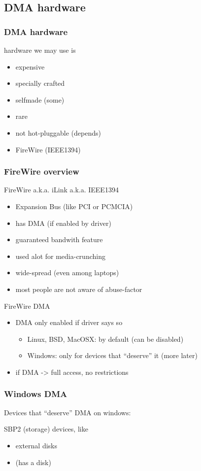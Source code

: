 \documentclass{beamer}
\newenvironment{itemizeframe}[1]
  {\begin{frame}{#1}\startitemizeframe}
  {\stopitemizeframe\end{frame}}
\newcommand\startitemizeframe{\begin{itemize}}
\newcommand\stopitemizeframe{\end{itemize}}
\begin{document}
	\subsection{DMA hardware}

		\begin{frame} \frametitle{DMA hardware}
			hardware we may use is
			\begin{itemize}
				\item expensive
				\item specially crafted
				\item selfmade (some)
				\item rare
				\item not hot-pluggable (depends)
				\item {} FireWire (IEEE1394)
			\end{itemize}
		\end{frame}

		\begin{frame} \frametitle{FireWire overview}
			 FireWire a.k.a. iLink a.k.a. IEEE1394
			\begin{itemize}
				\item Expansion Bus (like PCI or PCMCIA)
				\item has DMA (if enabled by driver)
				\item guaranteed bandwith feature
				\item used alot for media-crunching
				\item wide-spread (even among laptops)
				\item most people are not aware of abuse-factor
			\end{itemize}
		\end{frame}

		\begin{itemizeframe}{FireWire DMA}
			\item DMA only enabled if driver says so
			\begin{itemize}
				\item Linux, BSD, MacOSX: by default (can be disabled)
				\item Windows: only for devices that ``deserve'' it (more later)
			\end{itemize}
			\item if DMA -> full access, no restrictions
		\end{itemizeframe}

		\begin{frame} \frametitle{Windows DMA}
			Devices that ``deserve'' DMA on windows:

			SBP2 (storage) devices, like
			\begin{itemize}
				\item external disks
				\item {} (has a disk)
			\end{itemize}

		\end{frame}
		
\end{document}
